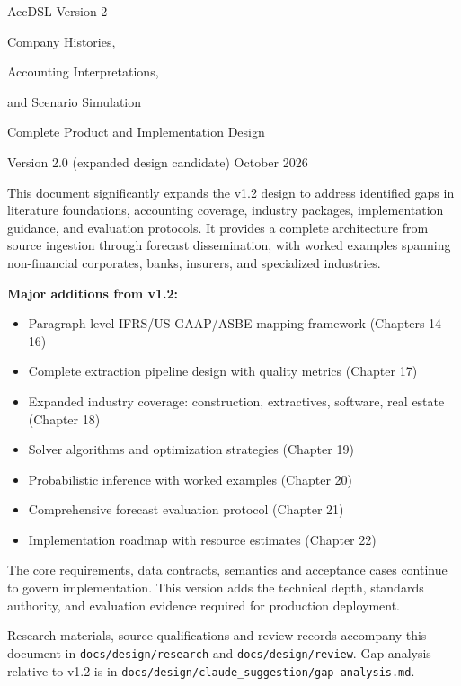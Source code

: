 \documentclass[11pt,a4paper]{report}
\newcommand{\code}[1]{\texttt{#1}}
\begin{document}
\hypersetup{pageanchor=false}
\begin{titlepage}
\vspace*{20mm}
{\sffamily\color{ink}\Huge AccDSL Version 2\par}
\vspace{7mm}
{\LARGE Company Histories,\par Accounting Interpretations,\par and Scenario Simulation\par}
\vspace{5mm}
{\Large Complete Product and Implementation Design\par}
\vspace{12mm}
{\large Version 2.0 (expanded design candidate)  October 2026\par}
\vfill
\begin{minipage}{0.9\textwidth}
This document significantly expands the v1.2 design to address identified gaps
in literature foundations, accounting coverage, industry packages, implementation
guidance, and evaluation protocols. It provides a complete architecture from
source ingestion through forecast dissemination, with worked examples spanning
non-financial corporates, banks, insurers, and specialized industries.

\textbf{Major additions from v1.2:}
\begin{itemize}
\item Paragraph-level IFRS/US GAAP/ASBE mapping framework (Chapters 14--16)
\item Complete extraction pipeline design with quality metrics (Chapter 17)
\item Expanded industry coverage: construction, extractives, software, real estate (Chapter 18)
\item Solver algorithms and optimization strategies (Chapter 19)
\item Probabilistic inference with worked examples (Chapter 20)
\item Comprehensive forecast evaluation protocol (Chapter 21)
\item Implementation roadmap with resource estimates (Chapter 22)
\end{itemize}

The core requirements, data contracts, semantics and acceptance cases continue
to govern implementation. This version adds the technical depth, standards
authority, and evaluation evidence required for production deployment.

\vspace{8mm}
Research materials, source qualifications and review records accompany this
document in \code{docs/design/research} and \code{docs/design/review}.
Gap analysis relative to v1.2 is in \code{docs/design/claude\_suggestion/gap-analysis.md}.
\end{minipage}
\end{titlepage}
\hypersetup{pageanchor=true}
\tableofcontents
\clearpage{}
\end{document}
